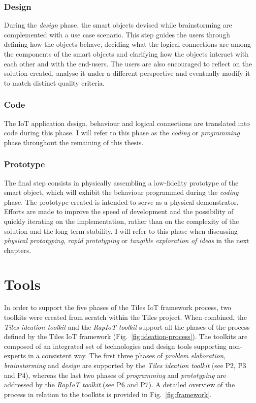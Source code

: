\subsubsection{Design}
During the \textit{design} phase, the smart objects devised while brainstorming are complemented with a use case scenario. This step guides the users through defining how the objects behave, deciding what the logical connections are among the components of the smart objects and clarifying how the objects interact with each other and with the end-users. The users are also encouraged to reflect on the solution created, analyse it under a different perspective and eventually modify it to match distinct quality criteria.

\subsubsection{Code}
The IoT application design, behaviour and logical connections are translated into code during this phase. I will refer to this phase as the \textit{coding} or \textit{programming} phase throughout the remaining of this thesis.

\subsubsection{Prototype}
The final step consists in physically assembling a low-fidelity prototype of the smart object, which will exhibit the behaviour programmed during the \textit{coding} phase. The prototype created is intended to serve as a physical demonstrator. Efforts are made to improve the speed of development and the possibility of quickly iterating on the implementation, rather than on the complexity of the solution and the long-term stability. I will refer to this phase when discussing \textit{physical prototyping}, \textit{rapid prototyping} or \textit{tangible exploration of ideas} in the next chapters.


\section{Tools}

In order to support the five phases of the Tiles IoT framework process, two toolkits were created from scratch within the Tiles project. When combined, the \textit{Tiles ideation toolkit} and the \textit{RapIoT toolkit} support all the phases of the process defined by the Tiles IoT framework (Fig.~\ref{fig:ideation-process}). The toolkits are composed of an integrated set of technologies and design tools supporting non-experts in a consistent way. The first three phases of \textit{problem elaboration}, \textit{brainstorming} and \textit{design} are supported by the \textit{Tiles ideation toolkit} (see P2, P3 and P4), whereas the last two phases of \textit{programming} and \textit{prototyping} are addressed by the \textit{RapIoT toolkit} (see P6 and P7). A detailed overview of the process in relation to the toolkits is provided in Fig.~\ref{fig:framework}.

